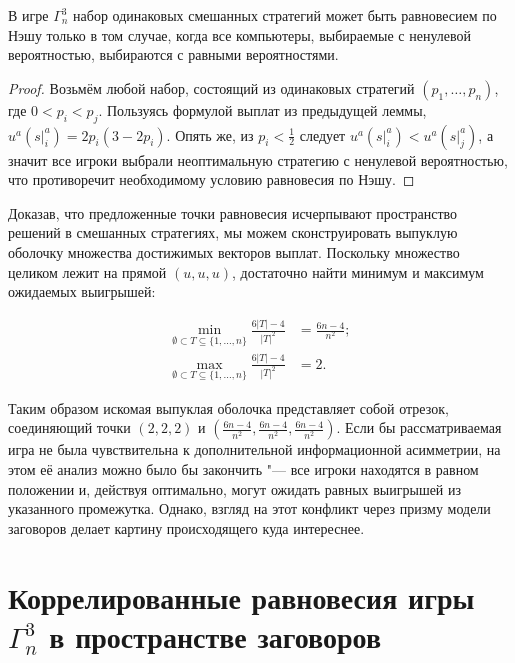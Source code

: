 \begin{lemma}
	В игре $\Gamma^3_n$ набор одинаковых смешанных стратегий может быть равновесием по Нэшу только в том случае, когда все компьютеры, выбираемые с ненулевой вероятностью, выбираются с равными вероятностями.
\end{lemma}

\begin{proof}
	Возьмём любой набор, состоящий из одинаковых стратегий $(p_1, \ldots, p_n)$, где $0 < p_i < p_j$. Пользуясь формулой выплат из предыдущей леммы, $u^a(\left. s \right|^a_i) = 2 p_i (3 - 2 p_i)$. Опять же, из $p_i < \frac{1}{2}$ следует $u^a(\left. s \right|^a_i) < u^a(\left. s \right|^a_j)$, а значит все игроки выбрали неоптимальную стратегию с ненулевой вероятностью, что противоречит необходимому условию равновесия по Нэшу.
\end{proof}

Доказав, что предложенные точки равновесия исчерпывают пространство решений в смешанных стратегиях, мы можем сконструировать выпуклую оболочку множества достижимых векторов выплат. Поскольку множество целиком лежит на прямой $(u, u, u)$, достаточно найти минимум и максимум ожидаемых выигрышей:

\begin{align*}
	\min_{\emptyset \subset T \subseteq \{1,\ldots,n\}} \frac{6 \left| T \right| - 4}{\left| T \right|^2} &= \frac{6 n - 4}{n^2};\\
	\max_{\emptyset \subset T \subseteq \{1,\ldots,n\}} \frac{6 \left| T \right| - 4}{\left| T \right|^2} &= 2.
\end{align*}

Таким образом искомая выпуклая оболочка представляет собой отрезок, соединяющий точки $(2, 2, 2)$ и $(\frac{6 n - 4}{n^2}, \frac{6 n - 4}{n^2}, \frac{6 n - 4}{n^2})$. Если бы рассматриваемая игра не была чувствительна к дополнительной информационной асимметрии, на этом её анализ можно было бы закончить "--- все игроки находятся в равном положении и, действуя оптимально, могут ожидать равных выигрышей из указанного промежутка. Однако, взгляд на этот конфликт через призму модели заговоров делает картину происходящего куда интереснее.

\section{Коррелированные равновесия игры $\Gamma^3_n$ в пространстве заговоров}\label{sec:ch2/sec4}

